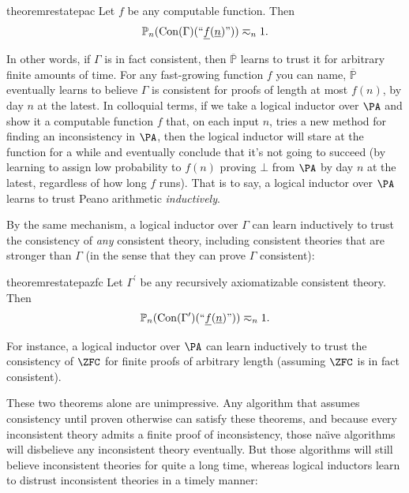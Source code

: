 \documentclass[authordate,onecolumn,noenvironments]{miri-tech-article}
\numberwithin{equation}{subsection}
\newcommand{\quot}[1]{``#1"}
\newcommand{\enc}[1]{{\underline{#1}}}
\newcommand{\seq}[1]{{\overline{#1}}}
\newcommand{\nn}{n}
\newcommand{\rparenthetical}[1]{\hfill\upshape{{\small (#1)}}} %
\newcommand{\proofin}[1]{\rparenthetical{Proof in:~#1.}}
\newcommand{\BelState}{\mathbb{P}}
\newcommand{\pt}{\BelState}
\newcommand{\MP}{\seq{\pt}}
\newcommand{\Theory}{\Gamma}
\newcommand{\consen}{\operatorname{Con}}
\begin{document}
\begin{restatable}{theorem}{restatepac}\label{thm:pac}
  Let $f$ be any computable function. Then
  \[
    \pt_\nn(\consen(\Theory)(\quot{\enc{f}(\enc{\nn})})) \eqsim_\nn 1.
  \]
  \proofin{\ref{app:pac}}
\end{restatable}

\noindent In other words, if $\Theory$ is in fact consistent, then $\MP$ learns to trust it for arbitrary finite amounts of time. For any fast-growing function $f$ you can name, $\MP$ eventually learns to believe $\Theory$ is consistent for proofs of length at most $f(n)$, by day $\nn$ at the latest. In colloquial terms, if we take a logical inductor over $\PA$ and show it a computable function $f$ that, on each input $\nn$, tries a new method for finding an inconsistency in $\PA$, then the logical inductor will stare at the function for a while and eventually conclude that it's not going to succeed (by learning to assign low probability to $f(\nn)$ proving $\bot$ from $\PA$ by day $\nn$ at the latest, regardless of how long $f$ runs). That is to say, a logical inductor over $\PA$ learns to trust Peano arithmetic \emph{inductively}.

By the same mechanism, a logical inductor over $\Theory$ can learn inductively to trust the consistency of \emph{any} consistent theory, including consistent theories that are stronger than $\Theory$ (in the sense that they can prove $\Theory$ consistent):

\begin{restatable}{theorem}{restatepazfc}\label{thm:pazfc}
  Let $\Theory^\prime$ be any recursively axiomatizable consistent theory. Then
  \[
    \pt_\nn(\consen(\Theory^\prime)(\quot{\enc{f}(\enc{\nn})})) \eqsim_\nn 1.
  \]
  \proofin{\ref{app:pazfc}}
\end{restatable}

\noindent For instance, a logical inductor over $\PA$ can learn inductively to trust the consistency of $\ZFC$ for finite proofs of arbitrary length (assuming $\ZFC$ is in fact consistent).

These two theorems alone are unimpressive. Any algorithm that assumes consistency until proven otherwise can satisfy these theorems, and because every inconsistent theory admits a finite proof of inconsistency, those na\"\i{}ve algorithms will disbelieve any inconsistent theory eventually. But those algorithms will still believe inconsistent theories for quite a long time, whereas logical inductors learn to distrust inconsistent theories in a timely manner:
\end{document}
